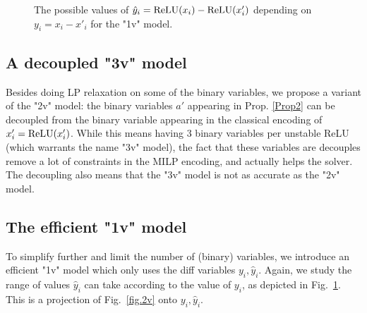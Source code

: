 	\begin{figure}[b!]
		\centering
	\hspace*{10ex}
\caption{The possible values of $\hat{y}_i=\mathrm{ReLU}(x_i)-\mathrm{ReLU}(x'_i)$ depending on $y_i = x_i-x'_i$ for the "1v" model.}
	\label{fig.1v}
\end{figure}


    \subsection{A decoupled "3v" model}

	Besides doing LP relaxation on some of the binary variables, we propose a 
    variant of the "2v" model: the binary variables $a'$ appearing in 
    Prop. \ref{Prop2} can be decoupled from the binary variable appearing in the classical encoding of $x'_i = \mathrm{ReLU}(x'_i)$. While this means having 3 binary variables per unstable ReLU (which warrants the name "3v" model), the fact that these variables are decouples remove a lot of constraints in the MILP encoding, and actually helps the solver. The decoupling also means that the "3v" model is not as accurate as the "2v" model.


	\subsection{The efficient "1v" model}
	
	To simplify further and limit the number of (binary) variables, 
    we introduce an efficient "1v" model which only uses the diff variables $y_i,\hat{y}_i$. Again, we study the range of values $\hat{y}_i$ can take according to the value of $y_i$, as depicted in Fig.~\ref{fig.1v}. This is a projection of Fig.~\ref{fig.2v} onto $y_i,\hat{y}_i$.
    


